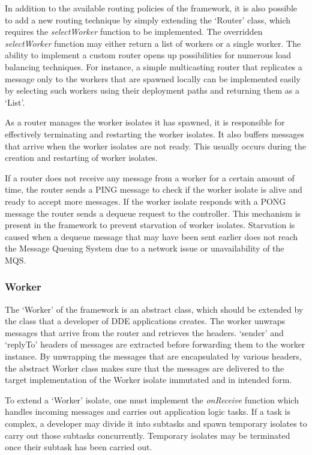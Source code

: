     In addition to the available routing policies of the framework, it is also possible to add a new routing technique by simply extending the ‘Router’ class, which requires the \emph{selectWorker} function to be implemented. The overridden \emph{selectWorker} function may either return a list of workers or a single worker. The ability to implement a custom router opens up possibilities for numerous load balancing techniques. For instance, a simple multicasting router that replicates a message only to the workers that are spawned locally can be implemented easily by selecting such workers using their deployment paths and returning them as a ‘List’.

    As a router manages the worker isolates it has spawned, it is responsible for effectively terminating and restarting the worker isolates. It also buffers messages that arrive when the worker isolates are not ready. This usually occurs during the creation and restarting of worker isolates.

    If a router does not receive any message from a worker for a certain amount of time, the router sends a PING message to check if the worker isolate is alive and ready to accept more messages. If the worker isolate responds with a PONG message the router sends a dequeue request to the controller. This mechanism is present in the framework to prevent starvation of worker isolates. Starvation is caused when a dequeue message that may have been sent earlier does not reach the Message Queuing System due to a network issue or unavailability of the MQS.

  \subsubsection{Worker}
  \label{subsubsec:worker}
  The ‘Worker’ of the framework is an abstract class, which should be extended by the class that a developer of \acrshort{DDE} applications creates. The worker unwraps messages that arrive from the router and retrieves the headers. ‘sender’ and ‘replyTo’ headers of messages are extracted before forwarding them to the worker instance. By unwrapping the messages that are encapsulated by various headers, the abstract Worker class makes sure that the messages are delivered to the target implementation of the Worker isolate immutated and in intended form.

  To extend a ‘Worker’ isolate, one must implement the \emph{onReceive} function which handles incoming messages and carries out application logic tasks. If a task is complex, a developer may divide it into subtasks and spawn temporary isolates to carry out those subtasks concurrently. Temporary isolates may be terminated once their subtask has been carried out.

